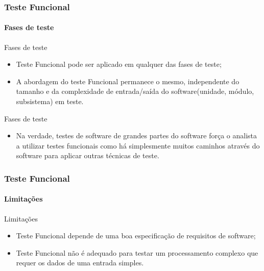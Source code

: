 \begin{frame}
\frametitle{Teste Funcional}
\framesubtitle{Fases de teste}

\begin{block:fact}{Fases de teste}
\begin{itemize}
	\item Teste Funcional pode ser aplicado em qualquer das fases de teste;

	\item A abordagem do teste Funcional  permanece o mesmo, independente do tamanho
	e da complexidade de entrada/saída do software(unidade, módulo, subsistema)
	em teste.
\end{itemize}
\end{block:fact}


\begin{block:fact}{Fases de teste}
\begin{itemize}
	\item Na verdade, testes de software de grandes partes do software força o analista
	a utilizar testes funcionais como há simplesmente muitos caminhos através do
	software para aplicar outras técnicas de teste.
\end{itemize}
\end{block:fact}
\end{frame}


\begin{frame}
\frametitle{Teste Funcional}
\framesubtitle{Limitações}

\begin{block:fact}{Limitações}
\begin{itemize}
	\item Teste Funcional depende de uma boa especificação de requisitos de software;

	\item Teste Funcional não é adequado para testar um processamento complexo
	que requer os dados de uma entrada simples.
\end{itemize}
\end{block:fact}
\end{frame}



